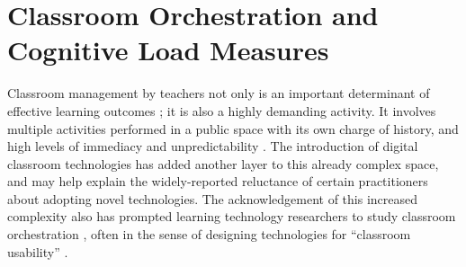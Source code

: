 \documentclass[10pt,journal,compsoc]{IEEEtran}
\begin{document}
%




\section{Classroom Orchestration and Cognitive Load Measures}\label{sec:related}

Classroom management by teachers not only is an important determinant of effective learning outcomes \cite{Gomez2013,Onrubia2012}; it is also a highly demanding activity. It involves multiple activities performed in a public space with its own charge of history, and high levels of immediacy and unpredictability \cite{Doyle2006}. The introduction of digital classroom technologies has added another layer to this already complex space, and may help explain the widely-reported reluctance of certain practitioners about adopting novel technologies. The acknowledgement of this increased complexity also has prompted learning technology researchers to study classroom orchestration \cite{Dillenbourg2009,Prieto2011}, often in the sense of designing technologies for ``classroom usability'' \cite{Dillenbourg2011}.
\end{document}
